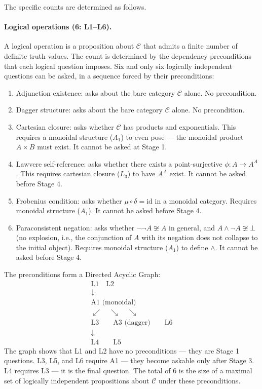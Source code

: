 \documentclass[12pt,a4paper]{article}
\begin{document}
The specific counts are determined as follows.

\paragraph{Logical operations (6: L1--L6).}
A logical operation is a proposition about $\mathcal{C}$ that admits a finite number of definite truth values. The count is determined by the dependency preconditions that each logical question imposes. Six and only six logically independent questions can be asked, in a sequence forced by their preconditions:
\begin{enumerate}[nosep, leftmargin=2em]
\item[\textbf{L1}] Adjunction existence: asks about the bare category $\mathcal{C}$ alone. No precondition.
\item[\textbf{L2}] Dagger structure: asks about the bare category $\mathcal{C}$ alone. No precondition.
\item[\textbf{L3}] Cartesian closure: asks whether $\mathcal{C}$ has products and exponentials. This requires a monoidal structure ($A_1$) to even pose --- the monoidal product $A \times B$ must exist. It cannot be asked at Stage 1.
\item[\textbf{L4}] Lawvere self-reference: asks whether there exists a point-surjective $\phi: A \to A^A$. This requires cartesian closure ($L_3$) to have $A^A$ exist. It cannot be asked before Stage 4.
\item[\textbf{L5}] Frobenius condition: asks whether $\mu\circ\delta = \text{id}$ in a monoidal category. Requires monoidal structure ($A_1$). It cannot be asked before Stage 4.
\item[\textbf{L6}] Paraconsistent negation: asks whether $\neg\neg A \not\cong A$ in general, and $A \wedge \neg A \not\cong \bot$ (no explosion, i.e., the conjunction of $A$ with its negation does not collapse to the initial object). Requires monoidal structure ($A_1$) to define $\wedge$. It cannot be asked before Stage 4.
\end{enumerate}
The preconditions form a Directed Acyclic Graph:
\[
\begin{array}{c}
\text{L1} \quad \text{L2} \\
\downarrow \\
\text{A1 (monoidal)} \\
\swarrow \quad \searrow \quad \searrow \\
\text{L3} \qquad \text{A3 (dagger)} \qquad \text{L6} \\
\downarrow \\
\text{L4} \qquad \text{L5}
\end{array}
\]
The graph shows that L1 and L2 have no preconditions --- they are Stage 1 questions. L3, L5, and L6 require A1 --- they become askable only after Stage 3. L4 requires L3 --- it is the final question. The total of 6 is the size of a maximal set of logically independent propositions about $\mathcal{C}$ under these preconditions.
\end{document}
